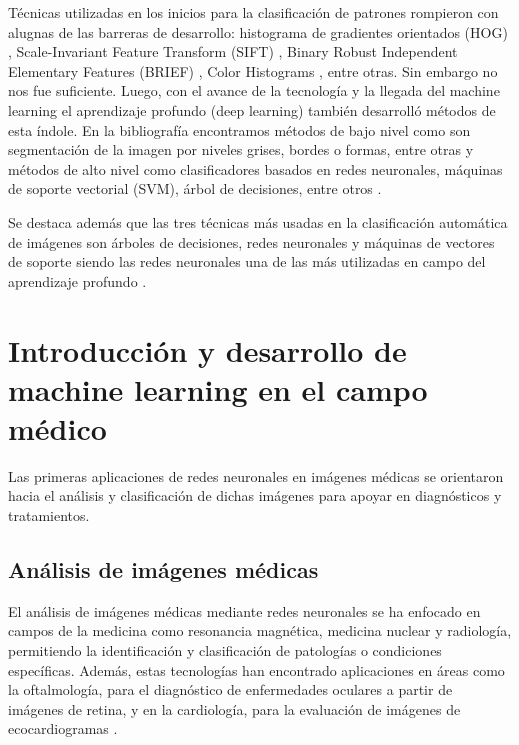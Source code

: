 Técnicas utilizadas en los inicios para la clasificación de patrones rompieron con alugnas de las barreras de desarrollo: histograma de gradientes orientados (HOG) , Scale-Invariant Feature Transform (SIFT) , Binary Robust Independent Elementary Features (BRIEF) , Color Histograms , entre otras. Sin embargo no nos fue suficiente. Luego, con el avance de la tecnología y la llegada del machine learning el aprendizaje profundo (deep learning) también desarrolló métodos de esta índole. En la bibliografía encontramos métodos de bajo nivel como son segmentación de la imagen por niveles grises, bordes o formas, entre otras y métodos de alto nivel como clasificadores basados en redes neuronales, máquinas de soporte vectorial (SVM), árbol de decisiones, entre otros . 

Se destaca además que las tres técnicas más usadas en la clasificación automática de imágenes son árboles de decisiones, redes neuronales y máquinas de vectores de soporte siendo las redes neuronales una de las más utilizadas en campo del aprendizaje profundo . 

\section{Introducción y desarrollo de machine learning en el campo médico}

Las primeras aplicaciones de redes neuronales en imágenes médicas se orientaron hacia el análisis y clasificación de dichas imágenes para apoyar 
en diagnósticos y tratamientos. 

\subsection{Análisis de imágenes médicas}

El análisis de imágenes médicas mediante redes neuronales se ha enfocado en campos de la medicina como resonancia magnética, medicina nuclear y radiología, permitiendo la identificación y clasificación de patologías o condiciones específicas. Además, estas tecnologías han encontrado aplicaciones en áreas como la oftalmología, para el diagnóstico de enfermedades oculares a partir de imágenes de retina, y en la cardiología, para la evaluación de imágenes de ecocardiogramas .

